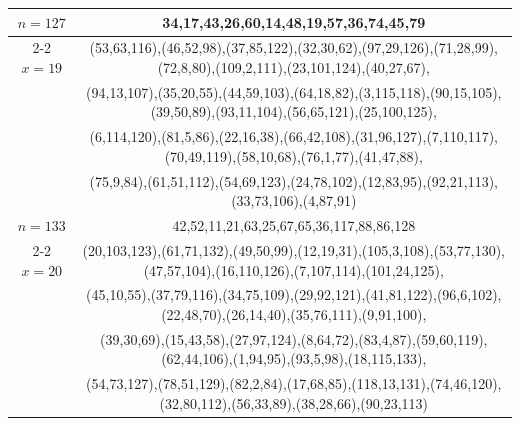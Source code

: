 \begin{tabular}{| c | c |}
\hline 
\(n=127\) & 
34,17,43,26,60,14,48,19,57,36,74,45,79\\
\cline{2-2}
\(x=19\)
&(53,63,116),(46,52,98),(37,85,122),(32,30,62),(97,29,126),(71,28,99),(72,8,80),(109,2,111),(23,101,124),(40,27,67),\\
&(94,13,107),(35,20,55),(44,59,103),(64,18,82),(3,115,118),(90,15,105),(39,50,89),(93,11,104),(56,65,121),(25,100,125),\\
&(6,114,120),(81,5,86),(22,16,38),(66,42,108),(31,96,127),(7,110,117),(70,49,119),(58,10,68),(76,1,77),(41,47,88),\\
&(75,9,84),(61,51,112),(54,69,123),(24,78,102),(12,83,95),(92,21,113),(33,73,106),(4,87,91)\\
\hline 
\(n=133\) & 
42,52,11,21,63,25,67,65,36,117,88,86,128\\
\cline{2-2}
\(x=20\)
&(20,103,123),(61,71,132),(49,50,99),(12,19,31),(105,3,108),(53,77,130),(47,57,104),(16,110,126),(7,107,114),(101,24,125),\\
&(45,10,55),(37,79,116),(34,75,109),(29,92,121),(41,81,122),(96,6,102),(22,48,70),(26,14,40),(35,76,111),(9,91,100),\\
&(39,30,69),(15,43,58),(27,97,124),(8,64,72),(83,4,87),(59,60,119),(62,44,106),(1,94,95),(93,5,98),(18,115,133),\\
&(54,73,127),(78,51,129),(82,2,84),(17,68,85),(118,13,131),(74,46,120),(32,80,112),(56,33,89),(38,28,66),(90,23,113)\\
\hline 
\end{tabular}